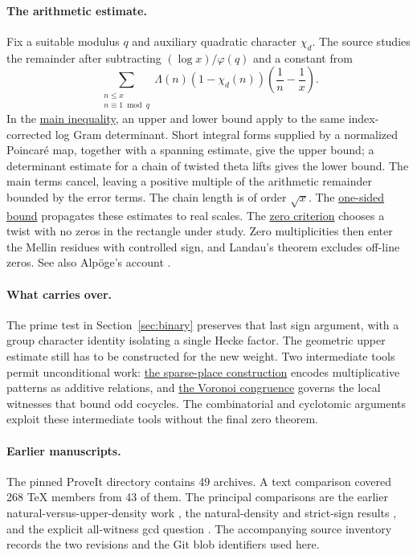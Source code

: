 \documentclass[11pt,letterpaper]{article}
\newcommand{\upsrc}[2]{\href{https://github.com/lsernau/grh-lean/blob/72fead102f663d5c7a407964a13dc0cf9d977207/grh/#1}{#2}}
\begin{document}
\paragraph{The arithmetic estimate.}
Fix a suitable modulus $q$ and auxiliary quadratic character $\chi_d$. The source studies the remainder after subtracting $(\log x)/\varphi(q)$ and a constant from
\[
  \sum_{\substack{n\le x\\n\equiv1\bmod q}}
      \Lambda(n)(1-\chi_d(n))\left(\frac1n-\frac1x\right).
\]
In the \upsrc{src/New/Reduction/MainInequality.lean}{main inequality}, an upper and lower bound apply to the same index-corrected log Gram determinant. Short integral forms supplied by a normalized Poincar\'e map, together with a spanning estimate, give the upper bound; a determinant estimate for a chain of twisted theta lifts gives the lower bound. The main terms cancel, leaving a positive multiple of the arithmetic remainder bounded by the error terms. The chain length is of order $\sqrt{x}$. The \upsrc{src/New/Reduction/OneSidedBound.lean}{one-sided bound} propagates these estimates to real scales. The \upsrc{src/New/Reduction/Zeros/Criterion.lean}{zero criterion} chooses a twist with no zeros in the rectangle under study. Zero multiplicities then enter the Mellin residues with controlled sign, and Landau's theorem excludes off-line zeros. See also Alp\"oge's account \cite{alpoge}.

\paragraph{What carries over.}
The prime test in Section~\ref{sec:binary} preserves that last sign argument, with a group character identity isolating a single Hecke factor. The geometric upper estimate still has to be constructed for the new weight. Two intermediate tools permit unconditional work: \upsrc{src/New/Reduction/Data/Existence.lean}{the sparse-place construction} encodes multiplicative patterns as additive relations, and \upsrc{src/Lib/Cyclotomic/Voronoi.lean}{the Voronoi congruence} governs the local witnesses that bound odd cocycles. The combinatorial and cyclotomic arguments exploit these intermediate tools without the final zero theorem.

\paragraph{Earlier manuscripts.}
The pinned ProveIt directory contains 49 archives. A text comparison covered 268 TeX members from 43 of them. The principal comparisons are the earlier natural-versus-upper-density work \cite{packetgap}, the natural-density and strict-sign results \cite{packetmc}, and the explicit all-witness gcd question \cite{packetcyc}. The accompanying source inventory records the two revisions and the Git blob identifiers used here.
\clearpage

\clearpage

\clearpage

\clearpage

\end{document}
